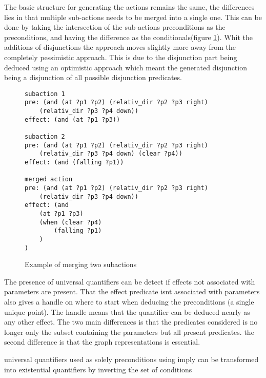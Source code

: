 	The basic structure for generating the actions remains the same, the differences lies in that multiple sub-actions needs to be merged into a single one. This can be done by taking the intersection of the sub-actions preconditions as the preconditions, and having the difference as the conditionals(figure \ref{merge}). Whit the additions of disjunctions the approach moves slightly more away from the completely pessimistic approach. This is due to the disjunction part being deduced using an optimistic approach which meant the generated disjunction being a disjunction of all possible disjunction predicates.
\begin{figure}
	\caption{Example of merging two subactions}
	\label{merge}
		\begin{lstlisting}
subaction 1
pre: (and (at ?p1 ?p2) (relativ_dir ?p2 ?p3 right) 
	(relativ_dir ?p3 ?p4 down))
effect: (and (at ?p1 ?p3))
		
subaction 2
pre: (and (at ?p1 ?p2) (relativ_dir ?p2 ?p3 right) 
	(relativ_dir ?p3 ?p4 down) (clear ?p4))
effect: (and (falling ?p1))
		
merged action
pre: (and (at ?p1 ?p2) (relativ_dir ?p2 ?p3 right) 
	(relativ_dir ?p3 ?p4 down))
effect: (and 
	(at ?p1 ?p3)
	(when (clear ?p4) 
		(falling ?p1)
	)
)
\end{lstlisting}
\end{figure}	

	
	
	


	The presence of universal quantifiers can be detect if effects not associated with parameters are present. That the effect predicate isnt associated with parameters also gives a handle on where to start when deducing the preconditions (a single unique point). The handle means that the quantifier can be deduced nearly as any other effect. The two main differences is that the predicates considered is no longer only the subset containing the parameters but all present predicates. the second  difference is that the graph representations is essential. 
	
	
	universal quantifiers used as solely preconditions using imply can be transformed into existential quantifiers by inverting the set of conditions
